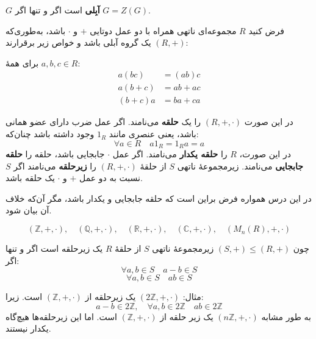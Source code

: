 \begin{remark}
    $G$ \textbf{آبِلی} است اگر و تنها اگر $G = Z(G)$.
\end{remark}


\begin{definition}[حلقه]
    فرض کنید $R$ مجموعه‌ای ناتهی همراه با دو عمل دوتایی $+$ و $\cdot$ باشد، به‌طوری‌که $(R, +)$ یک گروه آبلی باشد و خواص زیر برقرارند:

    برای همهٔ $a,b,c \in R$:
    \begin{align}
        a(bc)    & = (ab)c \tag{1}   \\
        a(b + c) & = ab + ac \tag{2} \\
        (b + c)a & = ba + ca \tag{3}
    \end{align}

    در این صورت $(R, +, \cdot)$ را یک \textbf{حلقه} می‌نامند.
    اگر عمل ضرب دارای عضو همانی باشد، یعنی عنصری مانند $1_R$ وجود داشته باشد چنان‌که:
    \[
        \forall a \in R \quad a 1_R = 1_R a = a
    \]
    در این صورت، $R$ را \textbf{حلقه یکدار} می‌نامند.
    اگر عمل $\cdot$ جابجایی باشد، حلقه را \textbf{حلقه جابجایی} می‌نامند.
    زیرمجموعهٔ ناتهی $S$ از حلقهٔ $(R, +, \cdot)$ را \textbf{زیرحلقه} می‌نامند اگر $S$ نسبت به دو عمل $+$ و $\cdot$ یک حلقه باشد.

\end{definition}



\begin{remark}
    در این درس همواره فرض براین است که حلقه جابجایی و یکدار باشد، مگر آن‌که خلاف آن بیان شود.
\end{remark}

\begin{example}
    \[
        (\mathbb{Z}, +, \cdot),\quad (\mathbb{Q}, +, \cdot),\quad (\mathbb{R}, +, \cdot),\quad (\mathbb{C}, +, \cdot),\quad (M_n(R), +, \cdot)
    \]
\end{example}


\begin{definition}
    چون $(S, +) \leqslant (R, +)$ زیرمجموعهٔ ناتهی $S$ از حلقهٔ $R$ یک زیرحلقه است اگر و تنها اگر:
    \[
        \forall a, b \in S \quad a - b \in S
    \]
    \[
        \forall a, b \in S \quad ab \in S
    \]

\end{definition}



\begin{remark}
    مثال: $(2\mathbb{Z}, +, \cdot)$ یک زیرحلقه از $(\mathbb{Z}, +, \cdot)$ است.
    زیرا:
    \[
        a - b \in 2\mathbb{Z}, \quad \forall a,b \in 2\mathbb{Z} \quad ab \in 2\mathbb{Z}
    \]
    به طور مشابه
    $(n\mathbb{Z}, +, \cdot)$
    یک زیر حلقه از
    $(\mathbb{Z}, +, \cdot)$
    است.
    اما این زیرحلقه‌ها هیچ‌گاه یکدار نیستند.
\end{remark}


